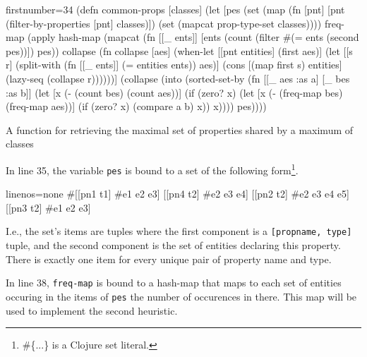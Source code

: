 \documentclass[submission]{eptcs}
\begin{document}
\begin{listing}[b!]
  \begin{clojurecode*}{firstnumber=34}
(defn common-props [classes]
  (let [pes (set (map (fn [pnt]
                        [pnt (filter-by-properties [pnt] classes)])
                      (set (mapcat prop-type-set classes))))
        freq-map (apply hash-map
                        (mapcat (fn [[_ ents]]
                                  [ents (count (filter #(= ents (second %
                                                       pes))])
                                pes))
        collapse (fn collapse [aes]
                   (when-let [[pnt entities] (first aes)]
                     (let [[s r] (split-with (fn [[_ ents]]
                                               (= entities ents)) aes)]
                       (cons [(map first s) entities]
                             (lazy-seq (collapse r))))))]
    (collapse (into (sorted-set-by
                     (fn [[_ aes :as a] [_ bes :as b]]
                       (let [x (- (count bes) (count aes))]
                         (if (zero? x)
                           (let [x (- (freq-map bes) (freq-map aes))]
                             (if (zero? x)
                               (compare a b)
                               x))
                           x))))
                    pes))))
  \end{clojurecode*}
  \caption{A function for retrieving the maximal set of properties shared by a
    maximum of classes}
  \label{lst:common-props}
\end{listing}

In line 35, the variable \verb|pes| is bound to a set of the following
form\footnote{\textsf{\#\{...\} is a Clojure set literal.}}.

\begin{clojurecode*}{linenos=none}
#{[[pn1 t1] #{e1 e2 e3}]
  [[pn4 t2] #{e2 e3 e4}]
  [[pn2 t2] #{e2 e3 e4 e5}]
  [[pn3 t2] #{e1 e2 e3}]}
\end{clojurecode*}

I.e., the set's items are tuples where the first component is a
\verb|[propname, type]| tuple, and the second component is the set of entities
declaring this property.  There is exactly one item for every unique pair of
property name and type.

In line 38, \verb|freq-map| is bound to a hash-map that maps to each set of
entities occuring in the items of \verb|pes| the number of occurences in there.
This map will be used to implement the second heuristic.
\end{document}
